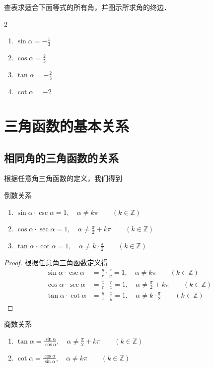 \begin{ex}
    查表求适合下面等式的所有角，并图示所求角的终边．
    \begin{multicols}{2}
\begin{enumerate}
    \item $\sin\alpha =-\frac{1}{3}$
    \item $\cos\alpha =\frac{2}{5}$
    \item $\tan\alpha =-\frac{2}{3}$
    \item $\cot\alpha=-2$
\end{enumerate} 
    \end{multicols}
\end{ex}

\section{三角函数的基本关系}
\subsection{相同角的三角函数的关系}
根据任意角三角函数的定义，我们得到

\begin{blk}{倒数关系}
\begin{enumerate}
    \item $\sin\alpha\cdot \csc\alpha=1,\quad \alpha\ne k\pi\qquad (k\in\mathbb{Z})$
    \item $\cos\alpha\cdot \sec\alpha=1,\quad \alpha\ne \frac{\pi}{2}+k\pi\qquad (k\in\mathbb{Z})$
    \item $\tan\alpha\cdot \cot \alpha=1,\quad \alpha\ne k\cdot \frac{\pi}{2}\qquad (k\in\mathbb{Z})$
\end{enumerate}
\end{blk}

\begin{proof}
    根据任意角三角函数定义得
\[\begin{split}
    \sin\alpha\cdot \csc\alpha&=\frac{y}{r}\cdot\frac{r}{y}=1,\quad \alpha\ne k\pi\qquad (k\in\mathbb{Z})\\
    \cos\alpha\cdot \sec\alpha&=\frac{x}{r}\cdot \frac{r}{x}=1,\quad \alpha\ne \frac{\pi}{2}+k\pi\qquad (k\in\mathbb{Z})\\
    \tan\alpha\cdot \cot \alpha&=\frac{y}{x}\cdot \frac{x}{y}=1,\quad \alpha\ne k\cdot \frac{\pi}{2}\qquad (k\in\mathbb{Z})
\end{split}\]
\end{proof}

\begin{blk}{商数关系}
\begin{enumerate}
    \item $\tan\alpha=\frac{\sin\alpha}{\cos\alpha},\quad \alpha\ne\frac{\pi}{2}+k\pi\qquad (k\in\mathbb{Z})$
    \item $\cot\alpha=\frac{\cos\alpha}{\sin\alpha},\quad \alpha\ne k\pi\qquad (k\in\mathbb{Z})$
\end{enumerate}
\end{blk}

